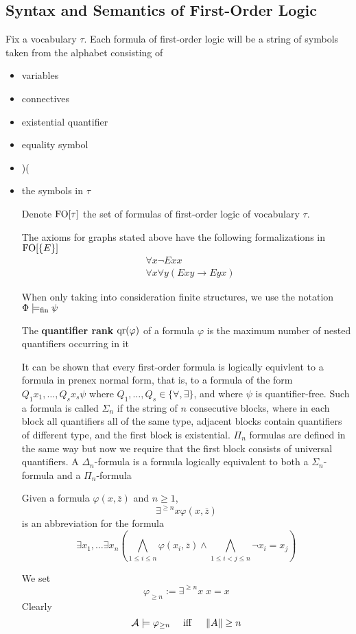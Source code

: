 \documentclass[11pt]{article}
\begin{document}
\subsection{Syntax and Semantics of First-Order Logic}
\label{sec:org7e76357}
Fix a vocabulary \(\tau\). Each formula of first-order logic will be a string of symbols taken from the
alphabet consisting of
\begin{itemize}
\item variables
\item connectives
\item existential quantifier
\item equality symbol
\item )(
\item the symbols in \(\tau\)

Denote \(\text{FO}[\tau]\) the set of formulas of first-order logic of vocabulary
\(\tau\).

The axioms for graphs stated above have the following formalizations in \(\text{FO}[\{E\}]\)
\begin{align*}
&\forall x\neg Exx\\
&\forall x\forall y(Exy\to Eyx)
\end{align*}

When only taking into consideration finite structures, we use the notation
\(\Phi\models_{\operatorname{fin}}\psi\)

The \textbf{quantifier rank} \(\operatorname{qr}(\varphi)\) of a formula \(\varphi\) is the maximum
number of nested quantifiers occurring in it

It can be shown that every first-order formula is logically equivlent to a
formula in prenex normal form, that is, to a formula of the form
\(Q_1x_1,\dots,Q_sx_s\psi\) where \(Q_1,\dots,Q_s\in\{\forall,\exists\}\),
and where \(\psi\) is quantifier-free. Such a formula is called \(\Sigma_n\) if
the string of \(n\) consecutive blocks, where in each block all quantifiers
all of the same type, adjacent blocks contain quantifiers of different type,
and the first block is existential. \(\Pi_n\) formulas are defined in the
same way but now we require that the first block consists of universal
quantifiers. A \(\Delta_n\)-formula is a formula logically equivalent to
both a \(\Sigma_n\)-formula and a \(\Pi_n\)-formula

Given a formula \(\varphi(x,\overbar{z})\) and \(n\ge1\),
\begin{equation*}
\exists^{\ge n}x\varphi(x,\overbar{z})
\end{equation*}
is an abbreviation for the formula
\begin{equation*}
\exists x_1,\dots\exists x_n(
\bigwedge_{1\le i\le n}\varphi(x_i,\overbar{z})\wedge
\bigwedge_{1\le i<j\le n}\neg x_i=x_j)
\end{equation*}

We set
\begin{equation*}
\varphi_{\ge n}:=\exists^{\ge n}x\;x=x
\end{equation*}
Clearly
\begin{equation*}
\mathcal{A}\models\varphi_{\ge n}\quad\text{ iff }\quad\left\lVert A\right\rVert\ge n
\end{equation*}
\end{itemize}
\end{document}
